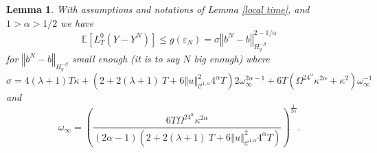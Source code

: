 \documentclass[11pt]{article}
\newtheorem{lem}[theo]{Lemma}
\newcommand{\norme}[1]{\left\Vert #1\right\Vert}
\newcommand{\E}{\mathbb{E}}
\begin{document}
\begin{lem}\label{key lemma}
    With assumptions and notations of Lemma \ref{local time}, and $1>\alpha>1/2$ we have
    \begin{equation}
    \E\left[L^0_T(Y-Y^N)\right]\leq g(\varepsilon_N) = \sigma\norme{b^N-b}_{H^{-\beta}_{q}}^{2-1/\alpha}
    \end{equation}
    for $\norme{b^N-b}_{H^{-\beta}_{q}}$ small enough (it is to say $N$ big enough) where \begin{equation*}
    \sigma = 4(\lambda + 1)T\kappa + \left(2 + 2(\lambda + 1)\ T + 6\norme{u}_{\mathcal{C}^{1,\alpha}}^2 4^{\alpha}T\right) 2\omega_\infty^{2\alpha-1} + 6T\left(\Omega^24^{\alpha}\kappa^{2\alpha} +\kappa^2\right)\omega_\infty^{-1}
    \end{equation*} and \begin{equation*}
    \omega_\infty=\left(\frac{6T\Omega^24^{\alpha}\kappa^{2\alpha} }{(2\alpha-1)\left(2 + 2(\lambda + 1)\ T + 6\norme{u}_{\mathcal{C}^{1,\alpha}}^2 4^{\alpha}T\right)}\right)^{\frac{1}{2\alpha}}.
    \end{equation*}
\end{lem}
\end{document}
